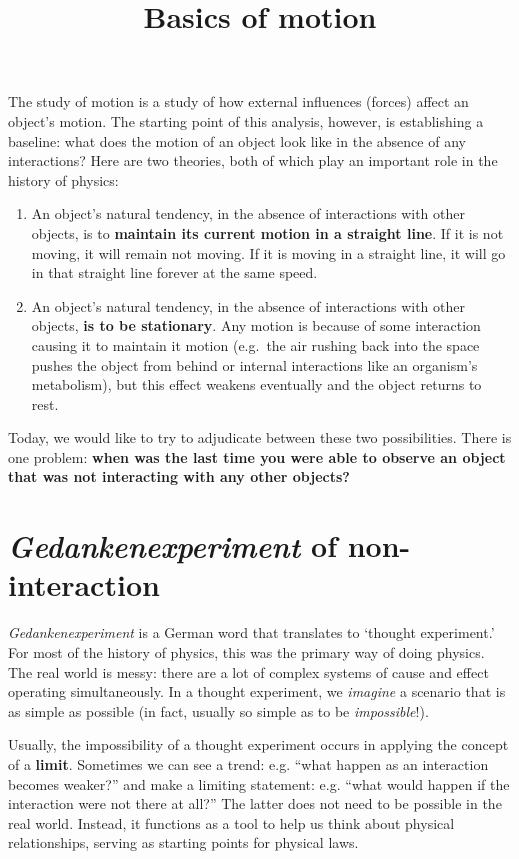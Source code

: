 \documentclass{handout}
\title{Basics of motion}
\begin{document}
\maketitle

The study of motion is a study of how external influences (forces) affect an object's motion. The starting point of this analysis, however, is establishing a baseline: what does the motion of an object look like in the absence of any interactions? Here are two theories, both of which play an important role in the history of physics:
\begin{enumerate}
    \item An object's natural tendency, in the absence of interactions with other objects, is to \textbf{maintain its current motion in a straight line}. If it is not moving, it will remain not moving. If it is moving in a straight line, it will go in that straight line forever at the same speed.
    \item An object's natural tendency, in the absence of interactions with other objects, \textbf{is to be stationary}. Any motion is because of some interaction causing it to maintain it motion (e.g.~the air rushing back into the space pushes the object from behind or internal interactions like an organism's  metabolism), but this effect weakens eventually and the object returns to rest.
\end{enumerate}

Today, we would like to try to adjudicate between these two possibilities. There is one
problem: \textbf{when was the last time you were able to observe an
object that was not interacting with any other objects?}

\section{\textit{Gedankenexperiment} of non-interaction}\label{the-limit-of-no-interaction}

\emph{Gedankenexperiment} is a German word that translates to `thought experiment.' For most of the history of physics, this was the primary way of doing physics. The real world is messy: there are a lot of complex systems of cause and effect operating simultaneously. In a thought experiment, we \emph{imagine} a scenario that is as simple as possible (in fact, usually so simple as to be \emph{impossible}!).

Usually, the impossibility of a thought experiment occurs in applying the concept of a \textbf{limit}. Sometimes we can see a trend: e.g. ``what happen as an interaction becomes weaker?'' and make a limiting statement: e.g. ``what would happen if the interaction were not there at all?'' The latter does not need to be possible in the real world. Instead, it functions as a tool to help us think about physical relationships, serving as starting points for physical laws.
\end{document}
